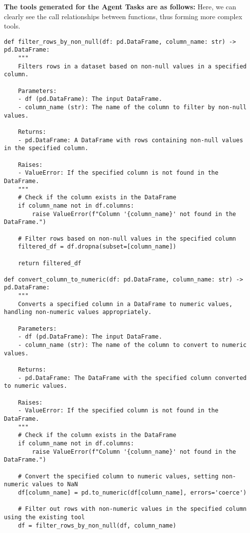 \textbf{The tools generated for the Agent Tasks are as follows:}
Here, we can clearly see the call relationships between functions, thus forming more complex tools.
\begin{tcolorbox}[title=Tools for DA-Bench, width=\textwidth,top=0mm,  breakable]
\begin{Verbatim}[breaklines=true, breakanywhere=true, fontsize=\footnotesize]
def filter_rows_by_non_null(df: pd.DataFrame, column_name: str) -> pd.DataFrame:
    """
    Filters rows in a dataset based on non-null values in a specified column.
    
    Parameters:
    - df (pd.DataFrame): The input DataFrame.
    - column_name (str): The name of the column to filter by non-null values.
    
    Returns:
    - pd.DataFrame: A DataFrame with rows containing non-null values in the specified column.
    
    Raises:
    - ValueError: If the specified column is not found in the DataFrame.
    """
    # Check if the column exists in the DataFrame
    if column_name not in df.columns:
        raise ValueError(f"Column '{column_name}' not found in the DataFrame.")
    
    # Filter rows based on non-null values in the specified column
    filtered_df = df.dropna(subset=[column_name])
    
    return filtered_df

def convert_column_to_numeric(df: pd.DataFrame, column_name: str) -> pd.DataFrame:
    """
    Converts a specified column in a DataFrame to numeric values, handling non-numeric values appropriately.
    
    Parameters:
    - df (pd.DataFrame): The input DataFrame.
    - column_name (str): The name of the column to convert to numeric values.
    
    Returns:
    - pd.DataFrame: The DataFrame with the specified column converted to numeric values.
    
    Raises:
    - ValueError: If the specified column is not found in the DataFrame.
    """
    # Check if the column exists in the DataFrame
    if column_name not in df.columns:
        raise ValueError(f"Column '{column_name}' not found in the DataFrame.")
    
    # Convert the specified column to numeric values, setting non-numeric values to NaN
    df[column_name] = pd.to_numeric(df[column_name], errors='coerce')
    
    # Filter out rows with non-numeric values in the specified column using the existing tool
    df = filter_rows_by_non_null(df, column_name)
    

\end{Verbatim}
\end{tcolorbox}
